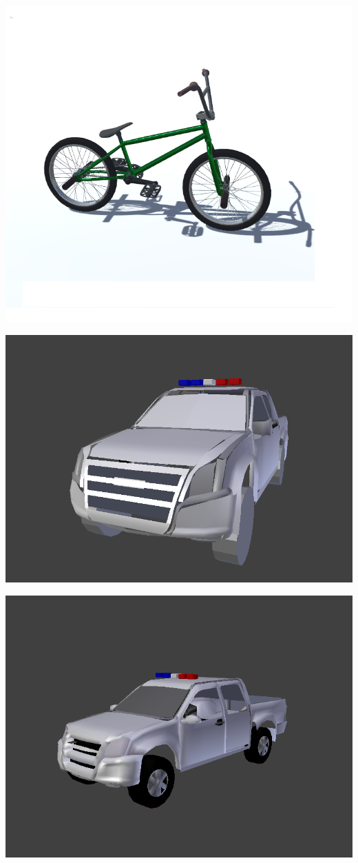 \documentclass{article}
\begin{document}
  \includegraphics[width=\textwidth]{15.png}

  \includegraphics[width=\textwidth]{2.png}
  
  \includegraphics[width=\textwidth]{11.png}
\end{document}
